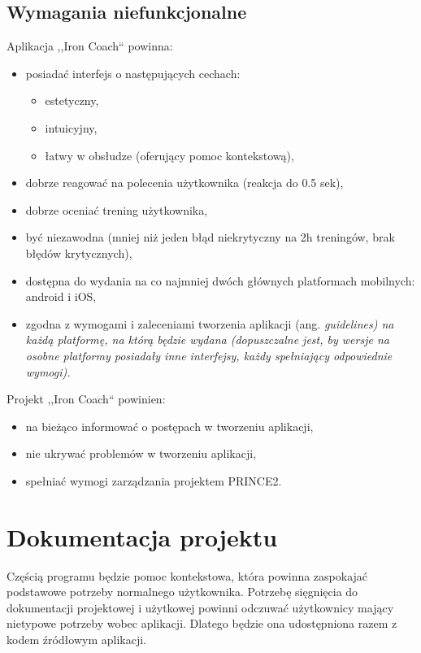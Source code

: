 \subsection{Wymagania niefunkcjonalne}
Aplikacja ,,Iron Coach`` powinna:
\begin{itemize}
  \item posiadać interfejs o następujących cechach:
    \begin{itemize}
      \item estetyczny,
      \item intuicyjny, 
      \item łatwy w obsłudze (oferujący pomoc kontekstową), 
    \end{itemize}
  \item dobrze reagować na polecenia użytkownika (reakcja do 0.5 sek),
  \item dobrze oceniać trening użytkownika,
  \item być niezawodna (mniej niż jeden błąd niekrytyczny na 2h treningów, brak błędów krytycznych),
  \item dostępna do wydania na co najmniej dwóch głównych platformach mobilnych: android i iOS,
  \item zgodna z wymogami i zaleceniami tworzenia aplikacji (ang. \it{guidelines})  na każdą platformę, na którą będzie wydana (dopuszczalne jest, by wersje na osobne platformy posiadały inne interfejsy, każdy spełniający odpowiednie wymogi).
\end{itemize}
\vspace{2pt}
Projekt ,,Iron Coach`` powinien:
\begin{itemize}
  \item na bieżąco informować o postępach w tworzeniu aplikacji,
  \item nie ukrywać problemów w tworzeniu aplikacji,
  \item spełniać wymogi zarządzania projektem PRINCE2.
\end{itemize}
\section{Dokumentacja projektu}
\noindent Częścią programu będzie pomoc kontekstowa, która powinna zaspokajać podstawowe potrzeby normalnego użytkownika. Potrzebę sięgnięcia do dokumentacji projektowej i użytkowej powinni odczuwać użytkownicy mający nietypowe potrzeby wobec aplikacji. Dlatego będzie ona udostępniona razem z kodem źródłowym aplikacji.
